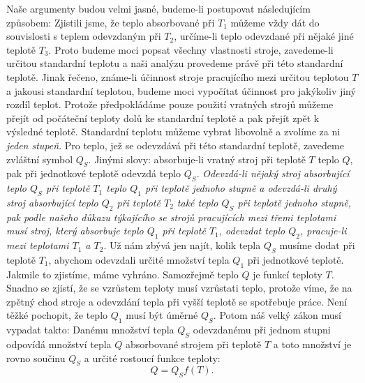     Naše argumenty budou velmi jasné, budeme-li postupovat následujícím způsobem: Zjistili jsme, že
    teplo absorbované při \(T_1\) můžeme vždy dát do souvislosti s teplem odevzdaným při \(T_2\),
    určíme-li teplo odevzdané při nějaké jiné teplotě \(T_3\). Proto budeme moci popsat všechny
    vlastnosti stroje, zavedeme-li určitou standardní teplotu a naši analýzu provedeme právě při
    této standardní teplotě. Jinak řečeno, známe-li účinnost stroje pracujícího mezi určitou
    teplotou \(T\) a jakousi standardní teplotou, budeme moci vypočítat účinnost pro jakýkoliv jiný
    rozdíl teplot. Protože předpokládáme pouze použití vratných strojů můžeme přejít od počáteční
    teploty dolů ke standardní teplotě a pak přejít zpět k výsledné teplotě. Standardní teplotu
    můžeme vybrat libovolně a zvolíme za ni \emph{jeden stupeň}. Pro teplo, jež se odevzdává při
    této standardní teplotě, zavedeme zvláštní symbol \(Q_S\). Jinými slovy: absorbuje-li vratný
    stroj při teplotě \(T\) teplo \(Q\), pak při jednotkové teplotě odevzdá teplo \(Q_S\).
    \emph{Odevzdá-li nějaký stroj absorbující teplo \(Q_S\) při teplotě \(T_1\) teplo \(Q_1\) při
    teplotě jednoho stupně a odevzdá-li druhý stroj absorbující teplo \(Q_2\) při teplotě \(T_2\)
    také teplo \(Q_S\) při teplotě jednoho stupně, pak podle našeho důkazu týkajícího se strojů
    pracujících mezi třemi teplotami musí stroj, který absorbuje teplo \(Q_1\) při teplotě \(T_1\),
    odevzdat teplo \(Q_2\), pracuje-li mezi teplotami \(T_1\) a \(T_2\)}. Už nám zbývá jen najít,
    kolik tepla \(Q_S\) musíme dodat při teplotě \(T_1\), abychom odevzdali určité množství tepla
    \(Q_1\) při jednotkové teplotě. Jakmile to zjistíme, máme vyhráno. Samozřejmě teplo \(Q\) je
    funkcí teploty \(T\). Snadno se zjistí, že se vzrůstem teploty musí vzrůstati teplo, protože
    víme, že na zpětný chod stroje a odevzdání tepla při vyšší teplotě se spotřebuje práce. Není
    těžké pochopit, že teplo \(Q_1\) musí být úměrné \(Q_S\). Potom náš velký zákon musí vypadat
    takto: Danému množství tepla \(Q_S\) odevzdanému při jednom stupni odpovídá množství tepla \(Q\)
    absorbované strojem při teplotě \(T\) a toto množství je rovno součinu \(Q_S\) a určité rostoucí
    funkce teploty:
    \begin{equation}\label{fyz:eq679}
      Q=Q_Sf(T).
    \end{equation}

